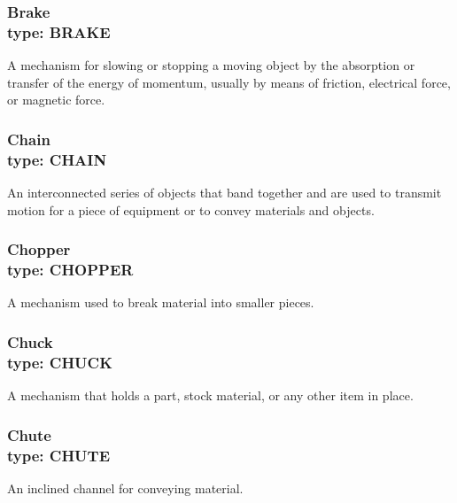 \subsubsection[Brake]{Brake \\ {\small type: BRAKE}}
\label{sec:Brake}



A mechanism for slowing or stopping a moving object by the absorption or transfer of the energy of momentum, usually by means of friction, electrical force, or magnetic force.



\subsubsection[Chain]{Chain \\ {\small type: CHAIN}}
\label{sec:Chain}



An interconnected series of objects that band together and are used to transmit motion for a piece of equipment or to convey materials and objects.



\subsubsection[Chopper]{Chopper \\ {\small type: CHOPPER}}
\label{sec:Chopper}



A mechanism used to break material into smaller pieces.



\subsubsection[Chuck]{Chuck \\ {\small type: CHUCK}}




A mechanism that holds a part, stock material, or any other item in place.



\subsubsection[Chute]{Chute \\ {\small type: CHUTE}}
\label{sec:Chute}



An inclined channel for conveying material.




